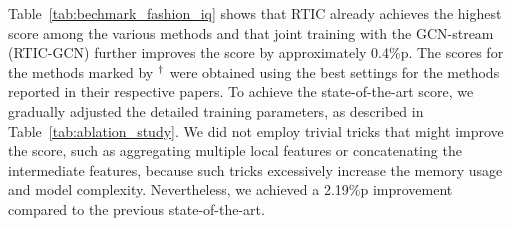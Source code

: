 \documentclass[10pt,twocolumn,letterpaper]{article}
\begin{document}
Table~\ref{tab:bechmark_fashion_iq} shows that RTIC already achieves the highest score among the various methods and that joint training with the GCN-stream (RTIC-GCN) further improves the score by approximately 0.4\%p. The scores for the methods marked by $\textsuperscript{\dag}$ were obtained using the best settings for the methods reported in their respective papers. To achieve the state-of-the-art score, we gradually adjusted the detailed training parameters, as described in Table~\ref{tab:ablation_study}. We did not employ trivial tricks that might improve the score, such as aggregating multiple local features or concatenating the intermediate features, because such tricks excessively increase the memory usage and model complexity. Nevertheless, we achieved a 2.19\%p improvement compared to the previous state-of-the-art.
\end{document}
